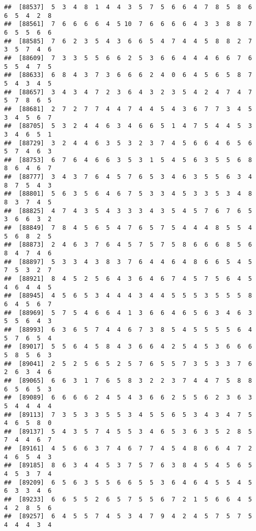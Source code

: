 \documentclass[
]{book}
\begin{document}
\begin{verbatim}
##  [88537]  5  3  4  8  1  4  4  3  5  7  5  6  6  4  7  8  5  8  6  6  5  4  2  8
##  [88561]  7  6  6  6  6  4  5 10  7  6  6  6  6  4  3  3  8  8  7  6  5  5  6  6
##  [88585]  7  6  2  3  5  4  3  6  6  5  4  7  4  4  5  8  8  2  7  3  5  7  4  6
##  [88609]  7  3  3  5  5  6  6  2  5  3  6  6  4  4  4  6  6  7  6  5  5  4  7  5
##  [88633]  6  8  4  3  7  3  6  6  6  2  4  0  6  4  5  6  5  8  7  5  4  3  4  5
##  [88657]  3  4  3  4  7  2  3  6  4  3  2  3  5  4  2  4  7  4  7  5  7  8  6  5
##  [88681]  2  7  2  7  7  4  4  7  4  4  5  4  3  6  7  7  3  4  5  3  4  5  6  7
##  [88705]  5  3  2  4  4  6  3  4  6  6  5  1  4  7  5  4  4  5  3  3  4  6  5  1
##  [88729]  3  2  4  4  6  3  5  3  2  3  7  4  5  6  6  4  6  5  6  5  7  4  6  3
##  [88753]  6  7  6  4  6  6  3  5  3  1  5  4  5  6  3  5  5  6  8  8  6  4  6  7
##  [88777]  3  4  3  7  6  4  5  7  6  5  3  4  6  3  5  5  6  3  4  8  7  5  4  3
##  [88801]  5  6  3  5  6  4  6  7  5  3  3  4  5  3  3  5  3  4  8  8  3  7  4  5
##  [88825]  4  7  4  3  5  4  3  3  3  4  3  5  4  5  7  6  7  6  5  3  6  6  3  2
##  [88849]  7  8  4  5  6  5  4  7  6  5  7  5  4  4  4  8  5  5  4  5  6  8  2  5
##  [88873]  2  4  6  3  7  6  4  5  7  5  7  5  8  6  6  6  8  5  6  8  4  7  4  6
##  [88897]  5  3  3  4  3  8  3  7  6  4  4  6  4  8  6  6  5  4  5  7  5  3  2  7
##  [88921]  8  4  5  2  5  6  4  3  6  4  6  7  4  5  7  5  6  4  5  4  6  4  4  5
##  [88945]  4  5  6  5  3  4  4  4  3  4  4  5  5  5  3  5  5  5  8  6  4  5  6  7
##  [88969]  5  7  5  4  6  6  4  1  3  6  6  4  6  5  6  3  4  6  3  5  5  6  4  3
##  [88993]  6  3  6  5  7  4  4  6  7  3  8  5  4  5  5  5  5  6  4  5  7  6  5  4
##  [89017]  5  5  6  4  5  8  4  3  6  6  4  2  5  4  5  3  6  6  6  5  8  5  6  3
##  [89041]  2  5  2  5  6  5  2  5  7  6  5  5  7  3  5  3  3  7  6  2  6  3  4  6
##  [89065]  6  6  3  1  7  6  5  8  3  2  2  3  7  4  4  7  5  8  8  6  5  6  5  3
##  [89089]  6  6  6  6  2  4  5  4  3  6  6  2  5  5  6  2  3  6  3  5  4  4  4  4
##  [89113]  7  3  5  3  3  5  5  3  4  5  5  6  5  3  4  3  4  7  5  4  6  5  8  0
##  [89137]  5  4  3  5  7  4  5  5  3  4  6  5  3  6  3  5  2  8  5  7  4  4  6  7
##  [89161]  4  5  6  6  3  7  4  6  7  7  4  5  4  8  6  6  4  7  2  4  6  5  4  3
##  [89185]  8  6  3  4  4  5  3  7  5  7  6  3  8  4  5  4  5  6  5  4  5  3  7  4
##  [89209]  6  5  6  3  5  5  6  6  5  5  3  6  4  6  4  5  5  4  5  6  3  3  4  6
##  [89233]  6  6  5  5  2  6  5  7  5  5  6  7  2  1  5  6  6  4  5  4  2  8  5  6
##  [89257]  6  4  5  5  7  4  5  3  4  7  9  4  2  4  5  7  5  7  5  4  4  4  3  4

\end{verbatim}
\end{document}

